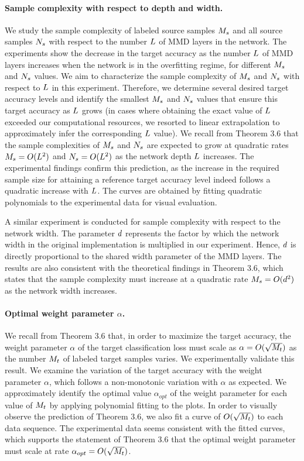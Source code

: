 \documentclass[review,supplement,onefignum,onetabnum]{siamonline250211}
\begin{document}
\paragraph{Sample complexity with respect to depth and width.}
We study the sample complexity of labeled source samples $M_s$ and all source samples $N_s$ with respect to the number  $L$ of MMD layers in the network. The experiments show the decrease in the target accuracy as the number  $L$ of MMD layers increases when the network is in the overfitting regime, for different $M_s$ and $N_s$ values. We aim to characterize the sample complexity of $M_s$ and $N_s$ with respect to $L$ in this experiment. Therefore, we determine several desired target accuracy levels and identify the smallest $M_s$ and $N_s$ values that ensure this target accuracy as $L$ grows (in cases where obtaining the exact value of $L$ exceeded our computational resources, we resorted to linear extrapolation to approximately infer the corresponding $L$ value). We recall from Theorem 3.6 that the sample complexities of $M_s$ and $N_s$ are expected to grow at quadratic rates $M_s=O(L^2)$ and $N_s=O(L^2)$ as the network depth $L$ increases. The experimental findings confirm this prediction, as the increase in the required sample size for attaining a reference target accuracy level indeed follows a quadratic increase with $L$. The curves are obtained by fitting quadratic polynomials to the experimental data for visual evaluation.

A similar experiment is conducted for sample complexity with respect to the network width. The parameter ${d}$ represents the factor by which the network width in the original implementation  \cite{mmd_code_pytorch} is multiplied in our experiment. Hence, ${d}$ is directly proportional to the shared width parameter of the MMD layers. The results are also consistent with the theoretical findings in Theorem 3.6, which states that the sample complexity must increase at a quadratic rate $M_s=O({d}^2)$ as the network width increases.

\paragraph{Optimal weight parameter $\alpha$.}
We recall from Theorem 3.6 that, in order to maximize the target accuracy, the weight parameter $\alpha$ of the target classification loss must scale as $\alpha=O(\sqrt{M_t})$ as the number $M_t$ of labeled target samples varies. We experimentally validate this result. We examine the variation of the target accuracy with the weight parameter $\alpha$, which follows a non-monotonic variation with $\alpha$ as expected. We approximately identify the optimal value $\alpha_{opt}$ of the weight parameter for each value of $M_t$ by applying polynomial fitting to the plots. In order to visually observe the prediction of Theorem  3.6, we also fit a curve of $O(\sqrt{M_t})$ to each data sequence. The experimental data seems consistent with the fitted  curves, which supports the statement of Theorem 3.6 that the optimal weight parameter must scale at rate $\alpha_{opt}=O(\sqrt{M_t})$.
\end{document}
